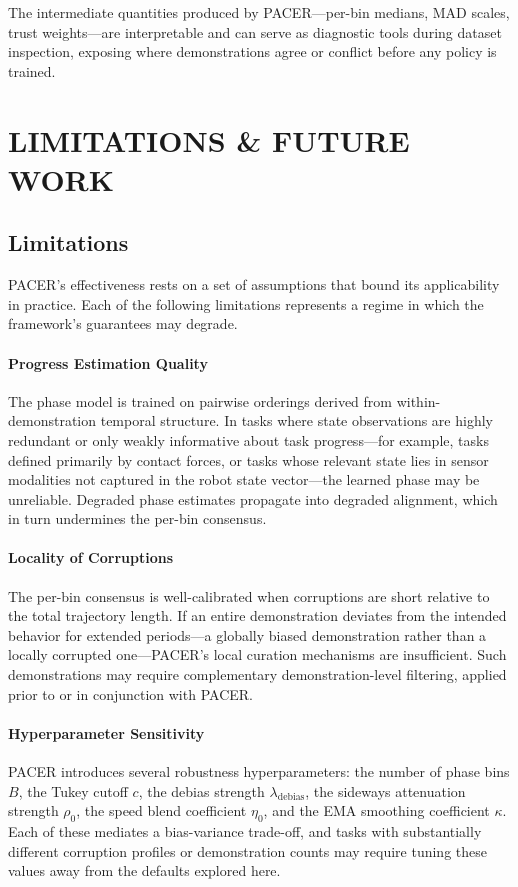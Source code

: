 \documentclass[a4paper, 10pt, conference]{ieeeconf}
\begin{document}
The intermediate quantities produced by PACER---per-bin medians, MAD scales, trust weights---are interpretable and can serve as diagnostic tools during dataset inspection, exposing where demonstrations agree or conflict before any policy is trained.

\newpage
\section{LIMITATIONS \& FUTURE WORK}

\subsection{Limitations}

PACER's effectiveness rests on a set of assumptions that bound its applicability in practice.
Each of the following limitations represents a regime in which the framework's guarantees may degrade.

\paragraph{Progress Estimation Quality}
The phase model is trained on pairwise orderings derived from within-demonstration temporal structure.
In tasks where state observations are highly redundant or only weakly informative about task progress---for example, tasks defined primarily by contact forces, or tasks whose relevant state lies in sensor modalities not captured in the robot state vector---the learned phase may be unreliable.
Degraded phase estimates propagate into degraded alignment, which in turn undermines the per-bin consensus.

\paragraph{Locality of Corruptions}
The per-bin consensus is well-calibrated when corruptions are short relative to the total trajectory length.
If an entire demonstration deviates from the intended behavior for extended periods---a globally biased demonstration rather than a locally corrupted one---PACER's local curation mechanisms are insufficient.
Such demonstrations may require complementary demonstration-level filtering, applied prior to or in conjunction with PACER.\@

\paragraph{Hyperparameter Sensitivity}
PACER introduces several robustness hyperparameters: the number of phase bins $B$, the Tukey cutoff $c$, the debias strength $\lambda_{\mathrm{debias}}$, the sideways attenuation strength $\rho_0$, the speed blend coefficient $\eta_0$, and the EMA smoothing coefficient $\kappa$.
Each of these mediates a bias-variance trade-off, and tasks with substantially different corruption profiles or demonstration counts may require tuning these values away from the defaults explored here.
\end{document}
